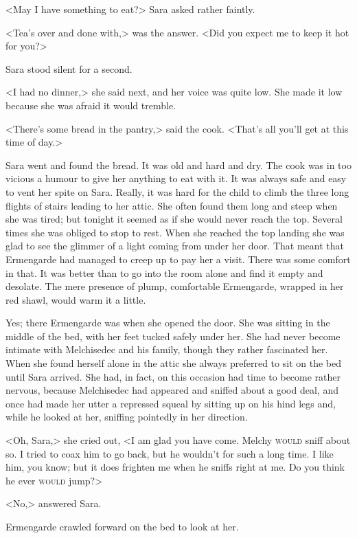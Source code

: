 <May I have something to eat?> Sara asked rather faintly.

<Tea's over and done with,> was the answer. <Did you expect me to keep it hot for you?>

Sara stood silent for a second.

<I had no dinner,> she said next, and her voice was quite low. She made it low because she was afraid it would tremble.

<There's some bread in the pantry,> said the cook. <That's all you'll get at this time of day.>

Sara went and found the bread. It was old and hard and dry. The cook was in too vicious a humour to give her anything to eat with it. It was always safe and easy to vent her spite on Sara. Really, it was hard for the child to climb the three long flights of stairs leading to her attic. She often found them long and steep when she was tired; but tonight it seemed as if she would never reach the top. Several times she was obliged to stop to rest. When she reached the top landing she was glad to see the glimmer of a light coming from under her door. That meant that Ermengarde had managed to creep up to pay her a visit. There was some comfort in that. It was better than to go into the room alone and find it empty and desolate. The mere presence of plump, comfortable Ermengarde, wrapped in her red shawl, would warm it a little.

Yes; there Ermengarde was when she opened the door. She was sitting in the middle of the bed, with her feet tucked safely under her. She had never become intimate with Melchisedec and his family, though they rather fascinated her. When she found herself alone in the attic she always preferred to sit on the bed until Sara arrived. She had, in fact, on this occasion had time to become rather nervous, because Melchisedec had appeared and sniffed about a good deal, and once had made her utter a repressed squeal by sitting up on his hind legs and, while he looked at her, sniffing pointedly in her direction.

<Oh, Sara,> she cried out, <I am glad you have come. Melchy \textsc{would} sniff about so. I tried to coax him to go back, but he wouldn't for such a long time. I like him, you know; but it does frighten me when he sniffs right at me. Do you think he ever \textsc{would} jump?>

<No,> answered Sara.

Ermengarde crawled forward on the bed to look at her.

